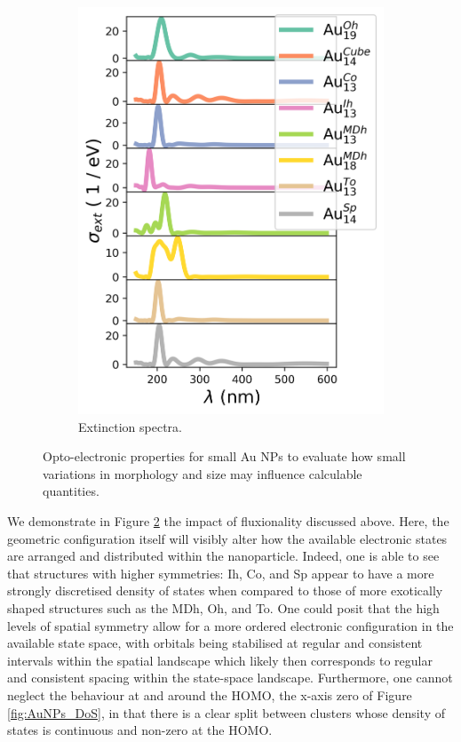 \begin{figure}
\begin{subfigure}{0.335\textwidth}
        \includegraphics[width=\textwidth]{figures/LM/Atomistic/Au_NPs_CSV.png}
        \caption{Extinction spectra.}
        \label{fig:AuNPs_CSV}
    \end{subfigure}
    \caption{Opto-electronic properties for small Au NPs to evaluate how small variations in morphology and size may influence calculable quantities.}
    \label{fig:DFT_AuNPs}
\end{figure}

We demonstrate in Figure \ref{fig:DFT_AuNPs} the impact of fluxionality discussed above. Here, the geometric configuration itself will visibly alter how the available electronic states are arranged and distributed within the nanoparticle. Indeed, one is able to see that structures with higher symmetries: Ih, Co, and Sp appear to have a more strongly discretised density of states when compared to those of more exotically shaped structures such as the MDh, Oh, and To. One could posit that the high levels of spatial symmetry allow for a more ordered electronic configuration in the available state space, with orbitals being stabilised at regular and consistent intervals within the spatial landscape which likely then corresponds to regular and consistent spacing within the state-space landscape. Furthermore, one cannot neglect the behaviour at and around the HOMO, the x-axis zero of Figure \ref{fig:AuNPs_DoS}, in that there is a clear split between clusters whose density of states is continuous and non-zero at the HOMO.

